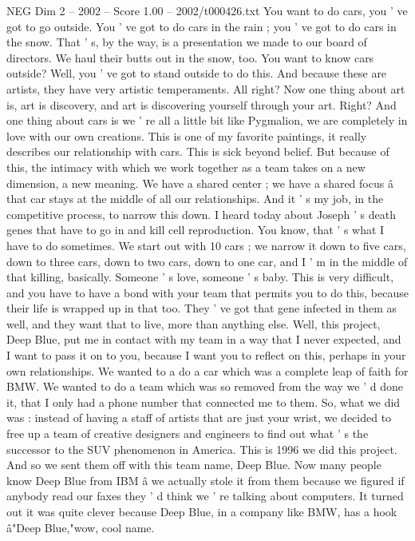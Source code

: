\begin{textsample}{NEG Dim 2 – 2002 – Score 1.00 – 2002/t000426.txt}
You want to do cars, you ' ve got to go outside.
You ' ve got to do cars in the rain ; you ' ve got to do cars in the snow.
That ' s, by the way, is a presentation we made to our board of directors.
We haul their butts out in the snow, too.
You want to know cars outside?
Well, you ' ve got to stand outside to do this.
And because these are artists, they have very artistic temperaments.
All right?
Now one thing about art is, art is discovery, and art is discovering yourself through your art.
Right?
And one thing about cars is we ' re all a little bit like Pygmalion, we are completely in love with our own creations.
This is one of my favorite paintings, it really describes our relationship with cars.
This is sick beyond belief.
But because of this, the intimacy with which we work together as a team takes on a new dimension, a new meaning.
We have a shared center ; we have a shared focus â that car stays at the middle of all our relationships.
And it ' s my job, in the competitive process, to narrow this down.
I heard today about Joseph ' s death genes that have to go in and kill cell reproduction.
You know, that ' s what I have to do sometimes.
We start out with 10 cars ; we narrow it down to five cars, down to three cars, down to two cars, down to one car, and I ' m in the middle of that killing, basically.
Someone ' s love, someone ' s baby.
This is very difficult, and you have to have a bond with your team that permits you to do this, because their life is wrapped up in that too.
They ' ve got that gene infected in them as well, and they want that to live, more than anything else.
Well, this project, Deep Blue, put me in contact with my team in a way that I never expected, and I want to pass it on to you, because I want you to reflect on this, perhaps in your own relationships.
We wanted to a do a car which was a complete leap of faith for BMW.
We wanted to do a team which was so removed from the way we ' d done it, that I only had a phone number that connected me to them.
So, what we did was : instead of having a staff of artists that are just your wrist, we decided to free up a team of creative designers and engineers to find out what ' s the successor to the SUV phenomenon in America.
This is 1996 we did this project.
And so we sent them off with this team name, Deep Blue.
Now many people know Deep Blue from IBM â we actually stole it from them because we figured if anybody read our faxes they ' d think we ' re talking about computers.
It turned out it was quite clever because Deep Blue, in a company like BMW, has a hook â"Deep Blue,"wow, cool name.

\end{textsample}
